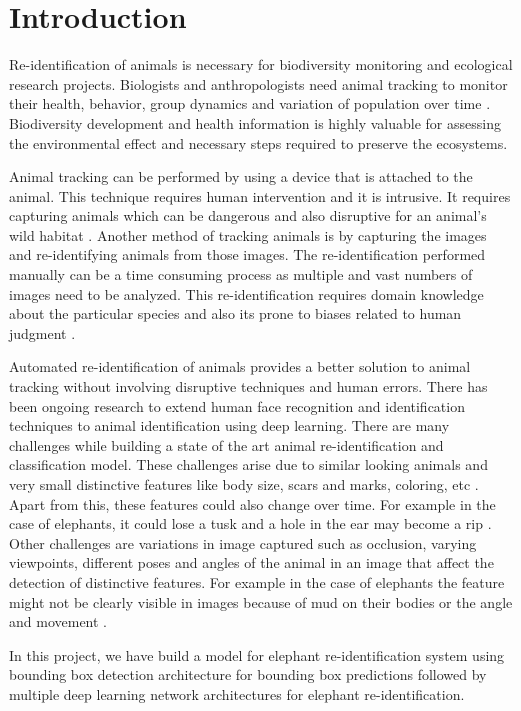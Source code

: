 \documentclass[10pt,twocolumn,letterpaper]{article}
\begin{document}
\section{Introduction}
\label{sec:intro}

Re-identification of animals is necessary for biodiversity monitoring and ecological research projects. Biologists and anthropologists need animal tracking to monitor their health, behavior, group dynamics and variation of population over time \cite{Deb}. Biodiversity development and health information is highly valuable for assessing the environmental effect and necessary steps required to preserve the ecosystems.

Animal tracking can be performed by using a device that is attached to the animal. This technique requires human intervention and it is intrusive. It requires capturing animals which can be dangerous and also disruptive for an animal's wild habitat \cite{Deb}. Another method of tracking animals is by capturing the images and re-identifying animals from those images. The re-identification performed manually can be a time consuming process as multiple and vast numbers of images need to be analyzed. This re-identification requires domain knowledge about the particular species and also its prone to biases related to human judgment \cite{SchneiReidentify}.

Automated re-identification of animals provides a better solution to animal tracking without involving disruptive techniques and human errors. There has been ongoing research to extend human face recognition and identification techniques to animal identification using deep learning. There are many challenges while building a state of the art animal re-identification and classification model. These challenges arise due to similar looking animals and very small distinctive features like body size, scars and marks, coloring, etc \cite{Korschens}. Apart from this, these features could also change over time. For example in the case of elephants, it could lose a tusk and a hole in the ear may become a rip \cite{Korschens}. Other challenges are variations in image captured such as occlusion, varying viewpoints, different poses and angles of the animal in an image that affect the detection of distinctive features. For example in the case of elephants the feature might not be clearly visible in images because of mud on their bodies or the angle and movement \cite{Korschens}.

In this project, we have build a model for elephant re-identification system using bounding box detection architecture for bounding box predictions followed by multiple deep learning network architectures for elephant re-identification.
\end{document}
